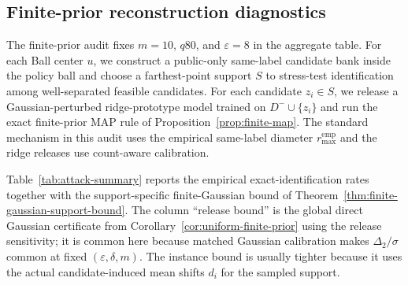 \documentclass[conference,compsoc]{IEEEtran}
\begin{document}
\subsection{Finite-prior reconstruction diagnostics}
\label{sec:finite-prior-diagnostics}

The finite-prior audit fixes $m=10$, $q80$, and $\varepsilon=8$ in the aggregate table. For each Ball center $u$, we construct a public-only same-label candidate bank inside the policy ball and choose a farthest-point support $S$ to stress-test identification among well-separated feasible candidates. For each candidate $z_i\in S$, we release a Gaussian-perturbed ridge-prototype model trained on $D^-\cup\{z_i\}$ and run the exact finite-prior MAP rule of Proposition~\ref{prop:finite-map}. The standard mechanism in this audit uses the empirical same-label diameter $r_{\max}^{\mathrm{emp}}$ and the ridge releases use count-aware calibration.

Table~\ref{tab:attack-summary} reports the empirical exact-identification rates together with the support-specific finite-Gaussian bound of Theorem~\ref{thm:finite-gaussian-support-bound}. The column ``release bound'' is the global direct Gaussian certificate from Corollary~\ref{cor:uniform-finite-prior} using the release sensitivity; it is common here because matched Gaussian calibration makes $\Delta_2/\sigma$ common at fixed $(\varepsilon,\delta,m)$. The instance bound is usually tighter because it uses the actual candidate-induced mean shifts $d_i$ for the sampled support.
\end{document}
